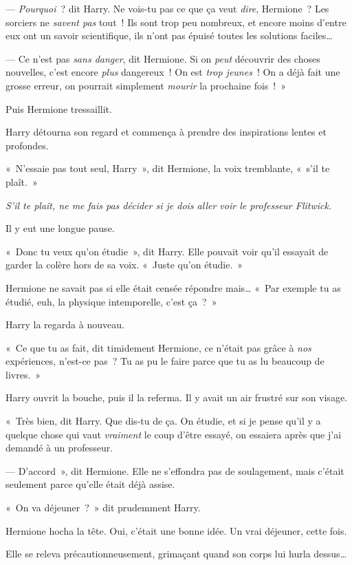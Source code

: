 --- \emph{Pourquoi}~? dit Harry. Ne vois-tu pas ce que ça veut \emph{dire}, Hermione~? Les sorciers ne \emph{savent pas} tout~! Ils sont trop peu nombreux, et encore moins d'entre eux ont un savoir scientifique, ils n'ont pas épuisé toutes les solutions faciles…

--- Ce n'est pas \emph{sans danger}, dit Hermione. Si on \emph{peut} découvrir des choses nouvelles, c'est encore \emph{plus} dangereux~! On est \emph{trop jeunes}~! On a déjà fait une grosse erreur, on pourrait simplement \emph{mourir} la prochaine fois~!~»

Puis Hermione tressaillit.

Harry détourna son regard et commença à prendre des inspirations lentes et profondes.

«~N'essaie pas tout seul, Harry~», dit Hermione, la voix tremblante, «~s'il te plaît.~»

\emph{S'il te plaît, ne me fais pas décider si je dois aller voir le professeur Flitwick.}

Il y eut une longue pause.

«~Donc tu veux qu'on étudie~», dit Harry. Elle pouvait voir qu'il essayait de garder la colère hors de sa voix. «~Juste qu'on étudie.~»

Hermione ne savait pas si elle était censée répondre mais… «~Par exemple tu as étudié, euh, la physique intemporelle, c'est ça~?~»

Harry la regarda à nouveau.

«~Ce que tu as fait, dit timidement Hermione, ce n'était pas grâce à \emph{nos} expériences, n'est-ce pas~? Tu as pu le faire parce que tu as lu beaucoup de livres.~»

Harry ouvrit la bouche, puis il la referma. Il y avait un air frustré sur son visage.

«~Très bien, dit Harry. Que dis-tu de ça. On étudie, et si je pense qu'il y a quelque chose qui vaut \emph{vraiment} le coup d'être essayé, on essaiera après que j'ai demandé à un professeur.

--- D'accord~», dit Hermione. Elle ne s'effondra pas de soulagement, mais c'était seulement parce qu'elle était déjà assise.

«~On va déjeuner~?~» dit prudemment Harry.

Hermione hocha la tête. Oui, c'était une bonne idée. Un vrai déjeuner, cette fois.

Elle se releva précautionneusement, grimaçant quand son corps lui hurla dessus…

